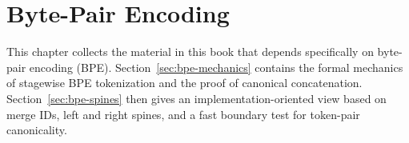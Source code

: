 \chapter{Byte-Pair Encoding}
\label{chap:bpe}

This chapter collects the material in this book that depends specifically on byte-pair
encoding (BPE). Section~\ref{sec:bpe-mechanics} contains the formal mechanics of stagewise
BPE tokenization and the proof of canonical concatenation. Section~\ref{sec:bpe-spines}
then gives an implementation-oriented view based on merge IDs, left and right spines,
and a fast boundary test for token-pair canonicality.



